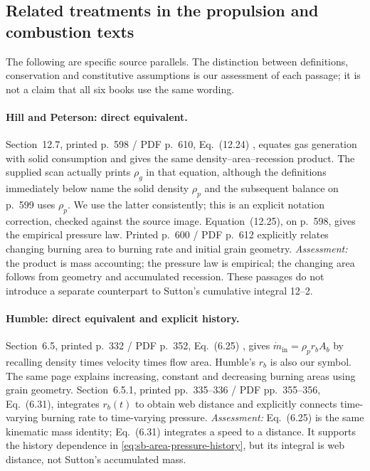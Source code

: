 \subsection{Related treatments in the propulsion and combustion texts}
\label{sec:sb-mass-crossrefs}
The following are specific source parallels. The distinction between
definitions, conservation and constitutive assumptions is our assessment
of each passage; it is not a claim that all six books use the same wording.

\paragraph{Hill and Peterson: direct equivalent.}
Section~12.7, printed p.~598 / PDF p.~610, Eq.~(12.24)
\cite{hillpeterson}, equates gas generation with solid consumption and
gives the same density--area--recession product. The supplied scan actually
prints $\rho_g$ in that equation, although the definitions immediately
below name the solid density $\rho_p$ and the subsequent balance on
p.~599 uses $\rho_p$. We use the latter consistently; this is an explicit
notation correction, checked against the source image.
Equation~(12.25), on p.~598, gives the empirical pressure law.
Printed p.~600 / PDF p.~612 explicitly relates changing burning area to
burning rate and initial grain geometry. \emph{Assessment:} the product is
mass accounting; the pressure law is empirical; the changing area follows
from geometry and accumulated recession. These passages do not introduce
a separate counterpart to Sutton's cumulative integral 12--2.

\paragraph{Humble: direct equivalent and explicit history.}
Section~6.5, printed p.~332 / PDF p.~352, Eq.~(6.25)
\cite{humble}, gives
$\dot m_{\mathrm{in}}=\rho_p r_b A_b$ by recalling density times velocity
times flow area. Humble's $r_b$ is also our symbol. The same page explains increasing,
constant and decreasing burning areas using grain geometry.
Section~6.5.1, printed pp.~335--336 / PDF pp.~355--356,
Eq.~(6.31), integrates $r_b(t)$ to obtain web distance and explicitly
connects time-varying burning rate to time-varying pressure.
\emph{Assessment:} Eq.~(6.25) is the same kinematic mass identity;
Eq.~(6.31) integrates a speed to a distance. It supports the history
dependence in \eqref{eq:sb-area-pressure-history}, but its integral is
web distance, not Sutton's accumulated mass.

